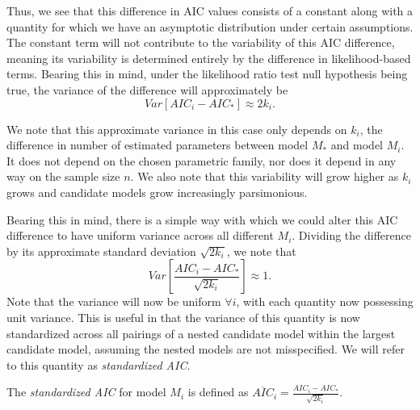 		Thus, we see that this difference in AIC values consists of a constant along with a quantity for which we have an asymptotic distribution under certain
		assumptions. The constant term will not contribute to the variability of this AIC difference, meaning its variability is determined entirely by the
		difference in likelihood-based terms. Bearing this in mind, under the likelihood ratio test null hypothesis being true, the variance of the difference
		will approximately be
		\begin{equation}
			Var[AIC_i - AIC_*] \approx 2 k_i .
		\end{equation}

		We note that this approximate variance in this case only depends on $k_i$, the difference in number of estimated parameters between model $M_*$ and model $M_i$. It does not
		depend on the chosen parametric family, nor does it depend in any way on the sample size $n$. We also note that this variability will grow higher as $k_i$ grows and candidate
		models grow increasingly parsimonious.

		Bearing this in mind, there is a simple way with which we could alter this AIC difference to have uniform variance across all different $M_i$. Dividing the difference
		by its approximate standard deviation $\sqrt{2 k_i}$, we note that
		\begin{equation}
			Var \left[ \frac{AIC_i - AIC_*}{\sqrt{2k_i}} \right] \approx 1 .
		\end{equation}
		Note that the variance will now be uniform $\forall i$, with each quantity now possessing unit variance. This is useful in that the variance of this quantity is now standardized
		across all pairings of a nested candidate model within the largest candidate model, assuming the nested models are not misspecified. We will refer to this quantity as
		\textit{standardized AIC}.

		\begin{definition}
			The \textit{standardized AIC} for model $M_i$ is defined as $\overline{AIC}_i = \frac{AIC_i - AIC_*}{\sqrt{2k_i}}$.
		\end{definition}

